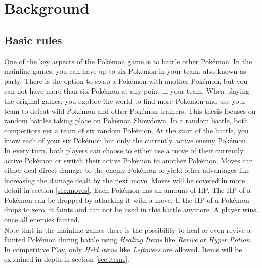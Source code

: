 \chapter{Background}

\section{Basic rules}
\label{sec:battling}
One of the key aspects of the Pokémon game is to battle other Pokémon. In the mainline games, you can 
have up to six Pokémon in your team, also known as party. There is the option to swap a Pokémon with
another Pokémon, but you can not have more than six Pokémon at any point in your team. When playing the 
original games, you explore the world to find more Pokémon and use your team to defeat wild Pokémon
and other Pokémon trainers. This thesis focuses on random battles taking place on Pokémon Showdown.
In a random battle, both competitors get a team of six random Pokémon. At the start of the battle,
you know each of your six Pokémon but only the currently active enemy Pokémon. \\
In every turn, both players can choose to either use a move of their currently active Pokémon or switch
their active Pokémon to another Pokémon. Moves can either deal direct damage to the enemy Pokémon or 
yield other advantages like increasing the damage dealt by the next move. Moves will be covered in more
detail in section \ref{sec:moves}. Each Pokémon has an amount of \ac{HP}. The \ac{HP} of a Pokémon
can be dropped by attacking it with a move. If the \ac{HP} of a Pokémon drops to zero, it faints and 
can not be used in this battle anymore. A player wins, once all enemies fainted. \\
Note that in the mainline games there is the possibility to heal or even revive a fainted 
Pokémon during battle using \textit{Healing Items} like \textit{Revive} or \textit{Hyper Potion}.
In competitive Play, only \textit{Held items} like \textit{Leftovers} are allowed. Items will be explained
in depth in section \ref{sec:items}.

